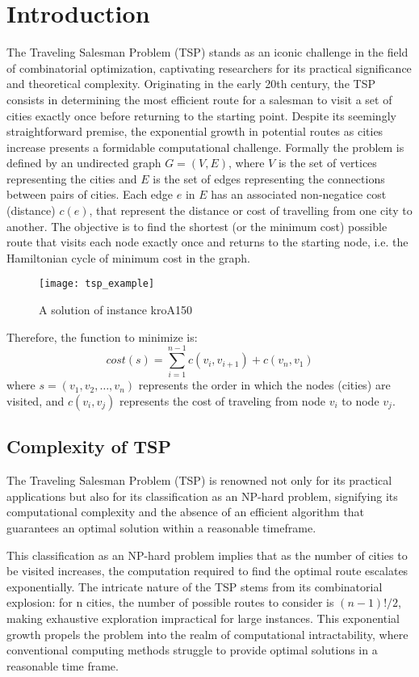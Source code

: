 \chapter{Introduction}

The Traveling Salesman Problem (TSP) stands as an iconic challenge in the field of combinatorial optimization,
captivating researchers for its practical significance and theoretical complexity. Originating in the early 20th century,
the TSP consists in determining the most efficient route for a salesman to visit a set of cities exactly once before returning 
to the starting point. Despite its seemingly straightforward premise, the exponential growth in potential routes as cities 
increase presents a formidable computational challenge.\newline
Formally the problem is defined by an undirected graph $G = (V,E)$, where $V$ is the set of vertices representing the cities and
$E$ is the set of edges representing the connections between pairs of cities. Each edge $e$ in $E$ 
has an associated non-negatice cost (distance) $c(e)$, that represent the distance or cost of travelling from one
city to another. The objective is to find the shortest (or the minimum cost) possible route that visits each node exactly
once and returns to the starting node, i.e. the Hamiltonian cycle of minimum cost in the graph.
\begin{figure}[H]
	\centering
	\texttt{[image: tsp\_example]}
	\caption{A solution of instance kroA150}
\end{figure}
Therefore, the function to minimize is:
\[
    cost(s) = \sum_{i=1}^{n-1} c(v_i, v_{i+1}) + c(v_n,v_1)
\]
where $s = (v_1,v_2,\ldots,v_n)$ represents the order in which the nodes (cities) are visited, and $c(v_i,v_j)$ 
represents the cost of traveling from node $v_i$ to node $v_j$.
\section{Complexity of TSP}

The Traveling Salesman Problem (TSP) is renowned not only for its practical applications but also for its classification as an NP-hard problem, signifying its computational complexity and the absence of an efficient algorithm that guarantees an optimal solution within a reasonable timeframe.

This classification as an NP-hard problem implies that as the number of cities to be visited increases, the computation required to find the optimal route escalates exponentially.
The intricate nature of the TSP stems from its combinatorial explosion: for n cities, the number of possible routes to consider is $(n-1)!/2$, making exhaustive exploration impractical for large instances.
This exponential growth propels the problem into the realm of computational intractability, where conventional computing methods struggle to provide optimal solutions in a reasonable time frame.

